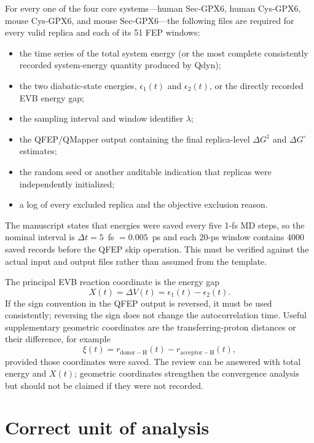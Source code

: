 \documentclass[11pt,a4paper]{article}
\begin{document}
For every one of the four core systems---human Sec-GPX6, human Cys-GPX6, mouse Cys-GPX6, and mouse Sec-GPX6---the following files are required for every valid replica and each of its 51 FEP windows:
\begin{itemize}
  \item the time series of the total system energy (or the most complete consistently recorded system-energy quantity produced by Qdyn);
  \item the two diabatic-state energies, $\epsilon_1(t)$ and $\epsilon_2(t)$, or the directly recorded EVB energy gap;
  \item the sampling interval and window identifier $\lambda$;
  \item the QFEP/QMapper output containing the final replica-level $\Delta G^{\ddagger}$ and $\Delta G^{\circ}$ estimates;
  \item the random seed or another auditable indication that replicas were independently initialized;
  \item a log of every excluded replica and the objective exclusion reason.
\end{itemize}

The manuscript states that energies were saved every five 1-fs MD steps, so the nominal interval is $\Delta t=5$~fs $=0.005$~ps and each 20-ps window contains 4000 saved records before the QFEP skip operation. This must be verified against the actual input and output files rather than assumed from the template.

The principal EVB reaction coordinate is the energy gap
\begin{equation}
  X(t)=\Delta V(t)=\epsilon_1(t)-\epsilon_2(t).
\end{equation}
If the sign convention in the QFEP output is reversed, it must be used consistently; reversing the sign does not change the autocorrelation time. Useful supplementary geometric coordinates are the transferring-proton distances or their difference, for example
\begin{equation}
  \xi(t)=r_{\mathrm{donor-H}}(t)-r_{\mathrm{acceptor-H}}(t),
\end{equation}
provided those coordinates were saved. The review can be answered with total energy and $X(t)$; geometric coordinates strengthen the convergence analysis but should not be claimed if they were not recorded.

\section{Correct unit of analysis}
\end{document}
